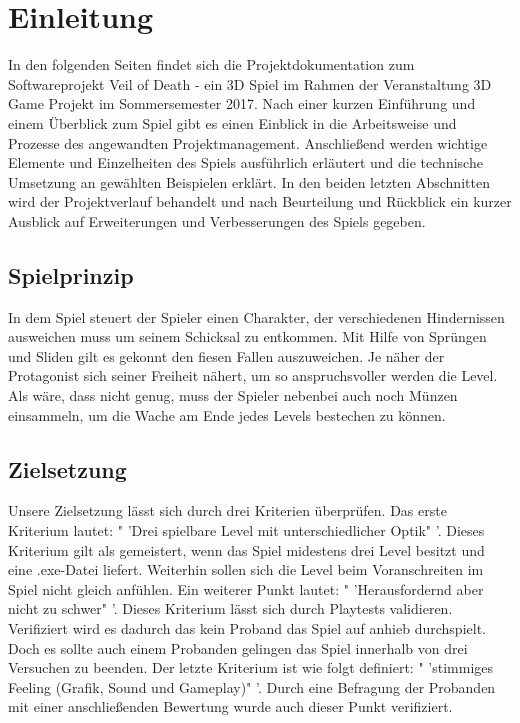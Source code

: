 \documentclass[12pt]{article}
\begin{document}



\newpage

\tableofcontents

\newpage
	
\section{Einleitung}
In den folgenden Seiten findet sich die Projektdokumentation zum Softwareprojekt \glqq Veil of Death \grqq{} - ein 3D Spiel im Rahmen der Veranstaltung 3D Game Projekt im Sommersemester 2017. \newline
Nach einer kurzen Einführung und einem Überblick zum Spiel gibt es einen Einblick in die Arbeitsweise und Prozesse des angewandten Projektmanagement.
Anschließend werden wichtige Elemente und Einzelheiten des Spiels ausführlich erläutert und die technische Umsetzung an gewählten Beispielen erklärt.
In den beiden letzten Abschnitten wird der Projektverlauf behandelt und nach Beurteilung und Rückblick ein kurzer Ausblick auf Erweiterungen und Verbesserungen des Spiels gegeben.

\vspace{2cm}
\subsection{Spielprinzip}

In dem Spiel steuert der Spieler einen Charakter, der verschiedenen Hindernissen ausweichen muss um seinem Schicksal zu entkommen. Mit Hilfe von
Sprüngen und Sliden gilt es gekonnt den fiesen Fallen auszuweichen. Je näher der Protagonist sich seiner Freiheit nähert, um so anspruchsvoller werden die Level.
Als wäre, dass nicht genug, muss der Spieler nebenbei auch noch Münzen einsammeln, um die Wache am Ende jedes Levels bestechen zu können.

\vspace{2cm}
\subsection{Zielsetzung}

Unsere Zielsetzung lässt sich durch drei Kriterien überprüfen.\newline
Das erste Kriterium lautet: " 'Drei spielbare Level mit unterschiedlicher Optik" '. Dieses
Kriterium gilt als gemeistert, wenn das Spiel midestens drei Level besitzt und eine .exe-Datei liefert. Weiterhin sollen sich die Level beim Voranschreiten im
Spiel nicht gleich anfühlen.\newline
Ein weiterer Punkt lautet: " 'Herausfordernd aber nicht zu schwer" '. Dieses Kriterium lässt sich durch Playtests validieren. Verifiziert wird es dadurch das
kein Proband das Spiel auf anhieb durchspielt. Doch es sollte auch einem Probanden gelingen das Spiel innerhalb von drei Versuchen zu beenden.\newline
Der letzte Kriterium ist wie folgt definiert: " 'stimmiges Feeling (Grafik, Sound und Gameplay)" '. Durch eine Befragung der Probanden mit einer anschließenden
Bewertung wurde auch dieser Punkt verifiziert.
\end{document}
